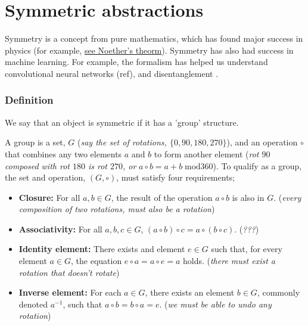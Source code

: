 \newpage
\section{Symmetric abstractions}\label{symmetric-abstractions}

Symmetry is a concept from pure mathematics, which has found major success in physics (for example, \href{https://en.wikipedia.org/wiki/Noether%27s_theorem}{see Noether's theorm}).
Symmetry has also had success in machine learning. For example, the formalism has
helped us understand convolutional neural networks (ref), and disentanglement \cite{Higgins2018}.




\subsubsection{Definition}

We say that an object is symmetric if it has a 'group' structure.

A group is a set, $G$ (\textit{say the set of rotations, $\{0, 90, 180, 270\}$}),
and an operation $\circ$ that combines any two elements $a$ and $b$ to form
another element (\textit{rot $90$ composed with rot $180$ is rot $270$, or} $a \circ b = a + b \;\text{mod} 360$).
To qualify as a group, the set and operation, $(G, \circ)$, must satisfy four requirements;

\begin{itemize}
	\tightlist
	\item \textbf{Closure:} For all $a, b \in G$, the result of the operation $a \circ b$ is also in $G$. (\textit{every composition of two rotations, must also be a rotation})
	\item \textbf{Associativity:} For all $a,b,c \in G$, $(a\circ b) \circ c = a\circ (b\circ c)$. (\textit{???})
	\item \textbf{Identity element:} There exists and element $e\in G$ such that, for every element $a\in G$, the equation $e\circ a = a\circ e = a$ holds. (\textit{there must exist a rotation that doesn't rotate})
	\item \textbf{Inverse element:} For each $a \in G$, there exists an element $b \in G$, commonly denoted $a^{−1}$, such that $a \circ b = b \circ a = e$. (\textit{we must be able to undo any rotation})
\end{itemize}

